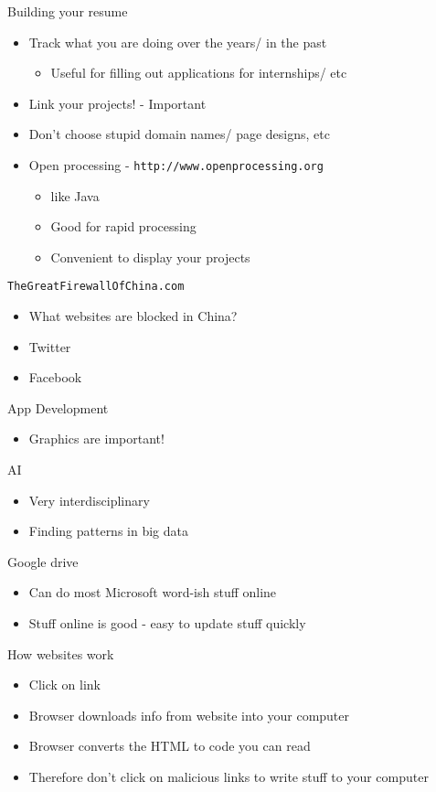 Building your resume
\begin{itemize}
  \item Track what you are doing over the years/ in the past
        \begin{itemize}
          \item Useful for filling out applications for internships/ etc
        \end{itemize}
 \item Link your projects! - Important
 \item Don't choose stupid domain names/ page designs, etc
 \item Open processing - \texttt{http://www.openprocessing.org}
        \begin{itemize}
          \item like Java
	   \item Good for rapid processing
	   \item Convenient to display your projects
        \end{itemize}
\end{itemize}

\texttt{TheGreatFirewallOfChina.com}
\begin{itemize}
  \item What websites are blocked in China?
  \item Twitter
  \item Facebook 
\end{itemize}

App Development
\begin{itemize}
  \item Graphics are important!
\end{itemize}

AI 
\begin{itemize}
  \item Very interdisciplinary 
  \item Finding patterns in big data 
\end{itemize}

Google drive
\begin{itemize}
  \item Can do most Microsoft word-ish stuff online
  \item Stuff online is good - easy to update stuff quickly
\end{itemize}

How websites work
\begin{itemize}
  \item Click on link
  \item Browser downloads info from website into your computer
  \item Browser converts the HTML to code you can read
  \item Therefore don't click on malicious links to write stuff to your computer
\end{itemize}


